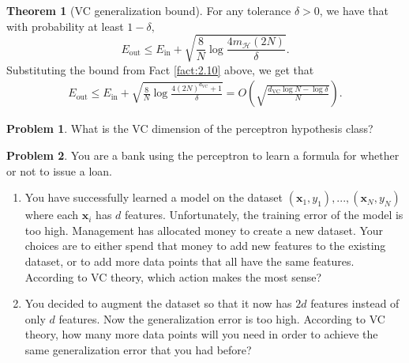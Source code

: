 \documentclass[10pt]{exam}
\theoremstyle{definition}
\newtheorem{problem}{Problem}
\newtheorem{theorem}{Theorem}
\newcommand{\R}{\mathbb R}
\DeclareMathOperator{\sign}{sign}
\newcommand{\Ein}{E_{\text{in}}}
\newcommand{\Eout}{E_{\text{out}}}
\newcommand{\x}{\mathbf x}
\newcommand{\mH}{m_{\mathcal H}}
\newcommand{\dvc}{{d_{\text{VC}}}}
\newcommand{\HH}[1]{\mathcal H_{\text{#1}}}
\begin{document}
\vspace{3in}
\begin{theorem}[VC generalization bound]
    For any tolerance $\delta>0$, we have that with probability at least $1-\delta,$
    \begin{equation}
        \Eout \le \Ein + \sqrt{\frac8N \log\frac{4\mH(2N)}{\delta}}.
    \end{equation}
    Substituting the bound from Fact \ref{fact:2.10} above,
    we get that
    \begin{align}
        \Eout 
        \le \Ein + \sqrt{\frac8N \log\frac{4(2N)^\dvc + 1}{\delta}} 
        = O\left(\sqrt{\frac{\dvc\log N - \log\delta}{N}}\right).
    \end{align}

\end{theorem}

\newpage
\begin{problem}
    What is the VC dimension of the perceptron hypothesis class?
\end{problem}

\newpage
\begin{problem}
    You are a bank using the perceptron to learn a formula for whether or not to issue a loan.
    \begin{enumerate}
        \item
            You have successfully learned a model on the dataset $(\x_1,y_1), ..., (\x_N,y_N)$ where each $\x_i$ has $d$ features.
            Unfortunately, the training error of the model is too high.
            Management has allocated money to create a new dataset.
            Your choices are to either spend that money to add new features to the existing dataset,
            or to add more data points that all have the same features.
            According to VC theory, which action makes the most sense?

            \vspace{4in}
        \item
            You decided to augment the dataset so that it now has $2d$ features instead of only $d$ features.
            Now the generalization error is too high.
            According to VC theory, how many more data points will you need in order to achieve the same generalization error that you had before?
    \end{enumerate}
\end{problem}

%
%
%
\end{document}
